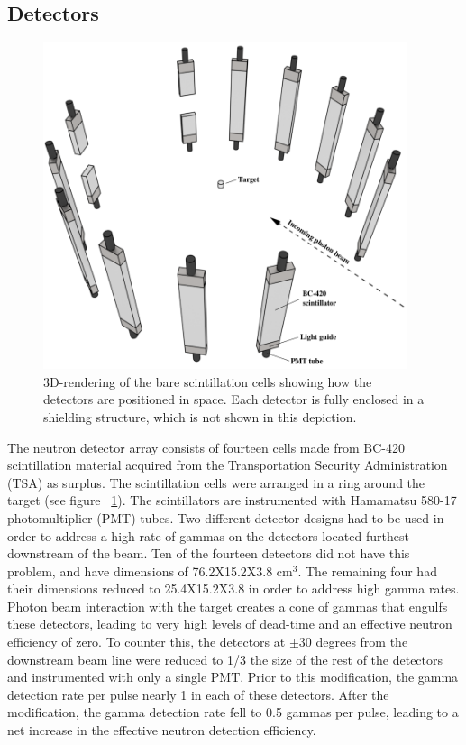 \subsection{Detectors}
\begin{figure}[h]
\centering
\includegraphics[width=0.95\textwidth]{Content/Methods/Detectors.png}
\caption{3D-rendering of the bare scintillation cells showing how the detectors are positioned in space. Each detector is fully enclosed in a shielding structure, which is not shown in this depiction.}
\label{fig:DetGeom}
\end{figure}
The neutron detector array consists of fourteen cells made from BC-420 scintillation material acquired from the Transportation Security Administration (TSA) as surplus. The scintillation cells were arranged in a ring around the target (see figure ~\ref{fig:DetGeom}). The scintillators are instrumented with Hamamatsu 580-17 photomultiplier (PMT) tubes. Two different detector designs had to be used in order to address a high rate of gammas on the detectors located furthest downstream of the beam. Ten of the fourteen detectors did not have this problem, and have dimensions of 76.2X15.2X3.8 cm$^3$. The remaining four had their dimensions reduced to 25.4X15.2X3.8 in order to address high gamma rates. 
Photon beam interaction with the target creates a cone of gammas that engulfs these detectors, leading to very high levels of dead-time and an effective neutron efficiency of zero. To counter this, the detectors at $\pm$30 degrees from the downstream beam line were reduced to 1/3 the size of the rest of the detectors and instrumented with only a single PMT. Prior to this modification, the gamma detection rate per pulse nearly 1 in each of these detectors. After the modification, the gamma detection rate fell to 0.5 gammas per pulse, leading to a net increase in the effective neutron detection efficiency. 

